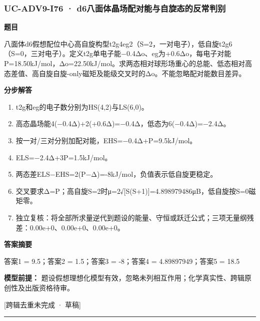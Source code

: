 \documentclass[UTF8,11pt,a4paper]{ctexart}
\begin{document}
\subsubsection*{UC-ADV9-I76 · d6八面体晶场配对能与自旋态的反常判别}
\noindent\textbf{题目}\par
八面体d6假想配位中心高自旋构型t2g4eg2（S=2，一对电子），低自旋t2g6（S=0，三对电子）。定义t2g单电子能−0.4Δo、eg为+0.6Δo，每电子对能P=18.50kJ/mol，Δo=22.50kJ/mol。求两态相对球形场重心的总能、低态相对高态差值、高自旋自旋-only磁矩及能级交叉时的Δo。不能忽略配对能数目差异。\par
\medskip\noindent\textbf{分步解答}
\begin{enumerate}
\item t2g和eg的电子数分别为HS(4,2)与LS(6,0)。
\item 高态晶场能4(−0.4Δ)+2(+0.6Δ)=−0.4Δ，低态为6(−0.4Δ)=−2.4Δ。
\item 按一对/三对分别加配对能，EHS=−0.4Δ+P=9.5kJ/mol。
\item ELS=−2.4Δ+3P=1.5kJ/mol。
\item 两态差ELS−EHS=2(P−Δ)=-8kJ/mol，负值表示低自旋更稳定。
\item 交叉要求Δ=P；高自旋S=2时μ=2√[S(S+1)]=4.898979486μB，低自旋按S=0磁矩零。
\item 独立复核：将全部所求量逆代到题设的能量、守恒或跃迁公式；三项无量纲残差：0.00e+0、0.00e+0、0.00e+0。
\end{enumerate}
\noindent\textbf{答案摘要}\par
答案1 = 9.5；答案2 = 1.5；答案3 = -8；答案4 = 4.89897949；答案5 = 18.5\par
\noindent\textbf{模型前提：}
题设假想理想化模型有效，忽略未列相互作用；化学真实性、跨辑原创性及出版资格待审。\par
\noindent\textcolor{red!65!black}{[跨辑去重未完成 · 草稿]} \par
\medskip\hrule\medskip
{}
\end{document}
